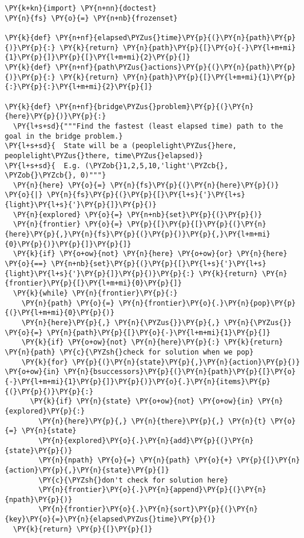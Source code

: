 \begin{Verbatim}[commandchars=\\\{\}]
\PY{k+kn}{import} \PY{n+nn}{doctest}
\PY{n}{fs} \PY{o}{=} \PY{n+nb}{frozenset}

\PY{k}{def} \PY{n+nf}{elapsed\PYZus{}time}\PY{p}{(}\PY{n}{path}\PY{p}{)}\PY{p}{:} \PY{k}{return} \PY{n}{path}\PY{p}{[}\PY{o}{-}\PY{l+m+mi}{1}\PY{p}{]}\PY{p}{[}\PY{l+m+mi}{2}\PY{p}{]}
\PY{k}{def} \PY{n+nf}{path\PYZus{}actions}\PY{p}{(}\PY{n}{path}\PY{p}{)}\PY{p}{:} \PY{k}{return} \PY{n}{path}\PY{p}{[}\PY{l+m+mi}{1}\PY{p}{:}\PY{p}{:}\PY{l+m+mi}{2}\PY{p}{]}

\PY{k}{def} \PY{n+nf}{bridge\PYZus{}problem}\PY{p}{(}\PY{n}{here}\PY{p}{)}\PY{p}{:}
  \PY{l+s+sd}{"""Find the fastest (least elapsed time) path to the goal in the bridge problem.}
\PY{l+s+sd}{  State will be a (peoplelight\PYZus{}here, peoplelight\PYZus{}there, time\PYZus{}elapsed)}
\PY{l+s+sd}{  E.g. (\PYZob{}1,2,5,10,'light'\PYZcb{}, \PYZob{}\PYZcb{}, 0)"""}
  \PY{n}{here} \PY{o}{=} \PY{n}{fs}\PY{p}{(}\PY{n}{here}\PY{p}{)} \PY{o}{|} \PY{n}{fs}\PY{p}{(}\PY{p}{[}\PY{l+s}{'}\PY{l+s}{light}\PY{l+s}{'}\PY{p}{]}\PY{p}{)}
  \PY{n}{explored} \PY{o}{=} \PY{n+nb}{set}\PY{p}{(}\PY{p}{)}
  \PY{n}{frontier} \PY{o}{=} \PY{p}{[}\PY{p}{[}\PY{p}{(}\PY{n}{here}\PY{p}{,}\PY{n}{fs}\PY{p}{(}\PY{p}{)}\PY{p}{,}\PY{l+m+mi}{0}\PY{p}{)}\PY{p}{]}\PY{p}{]}
  \PY{k}{if} \PY{o+ow}{not} \PY{n}{here} \PY{o+ow}{or} \PY{n}{here} \PY{o}{==} \PY{n+nb}{set}\PY{p}{(}\PY{p}{[}\PY{l+s}{'}\PY{l+s}{light}\PY{l+s}{'}\PY{p}{]}\PY{p}{)}\PY{p}{:} \PY{k}{return} \PY{n}{frontier}\PY{p}{[}\PY{l+m+mi}{0}\PY{p}{]}
  \PY{k}{while} \PY{n}{frontier}\PY{p}{:}
    \PY{n}{path} \PY{o}{=} \PY{n}{frontier}\PY{o}{.}\PY{n}{pop}\PY{p}{(}\PY{l+m+mi}{0}\PY{p}{)}
    \PY{n}{here}\PY{p}{,} \PY{n}{\PYZus{}}\PY{p}{,} \PY{n}{\PYZus{}} \PY{o}{=} \PY{n}{path}\PY{p}{[}\PY{o}{-}\PY{l+m+mi}{1}\PY{p}{]}
    \PY{k}{if} \PY{o+ow}{not} \PY{n}{here}\PY{p}{:} \PY{k}{return} \PY{n}{path} \PY{c}{\PYZsh{}check for solution when we pop}
    \PY{k}{for} \PY{p}{(}\PY{n}{state}\PY{p}{,}\PY{n}{action}\PY{p}{)} \PY{o+ow}{in} \PY{n}{bsuccessors}\PY{p}{(}\PY{n}{path}\PY{p}{[}\PY{o}{-}\PY{l+m+mi}{1}\PY{p}{]}\PY{p}{)}\PY{o}{.}\PY{n}{items}\PY{p}{(}\PY{p}{)}\PY{p}{:}
      \PY{k}{if} \PY{n}{state} \PY{o+ow}{not} \PY{o+ow}{in} \PY{n}{explored}\PY{p}{:}
        \PY{n}{here}\PY{p}{,} \PY{n}{there}\PY{p}{,} \PY{n}{t} \PY{o}{=} \PY{n}{state}
        \PY{n}{explored}\PY{o}{.}\PY{n}{add}\PY{p}{(}\PY{n}{state}\PY{p}{)}
        \PY{n}{npath} \PY{o}{=} \PY{n}{path} \PY{o}{+} \PY{p}{[}\PY{n}{action}\PY{p}{,}\PY{n}{state}\PY{p}{]}
        \PY{c}{\PYZsh{}don't check for solution here}
        \PY{n}{frontier}\PY{o}{.}\PY{n}{append}\PY{p}{(}\PY{n}{npath}\PY{p}{)}
        \PY{n}{frontier}\PY{o}{.}\PY{n}{sort}\PY{p}{(}\PY{n}{key}\PY{o}{=}\PY{n}{elapsed\PYZus{}time}\PY{p}{)}
  \PY{k}{return} \PY{p}{[}\PY{p}{]}


\end{Verbatim}
